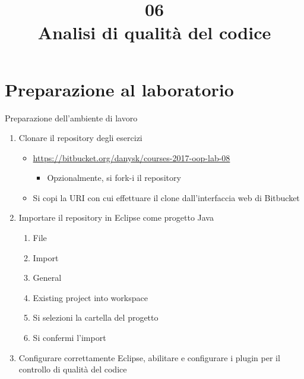 \documentclass[presentation]{beamer}
\title[Code quality]{06\\ Analisi di qualità del codice}
\begin{document}
\section{Preparazione al laboratorio}

\begin{frame}{Preparazione dell'ambiente di lavoro}
	\begin{enumerate}
		\item Clonare il repository degli esercizi
		\begin{itemize}
			\item \url{https://bitbucket.org/danysk/courses-2017-oop-lab-08}
			\begin{itemize}
				\item Opzionalmente, si fork-i il repository
			\end{itemize}
			\item Si copi la URI con cui effettuare il clone dall'interfaccia web di Bitbucket
		\end{itemize}
		\item Importare il repository in Eclipse come progetto Java
		\begin{enumerate}
			\item File
			\item Import
			\item General
			\item Existing project into workspace
			\item Si selezioni la cartella del progetto
			\item Si confermi l'import
		\end{enumerate}
		\item \alert{Configurare correttamente Eclipse, abilitare e configurare i plugin per il controllo di qualità del codice}
	\end{enumerate}
\end{frame}
\end{document}
